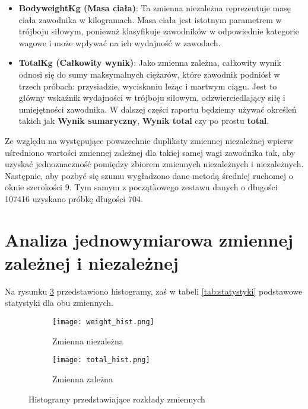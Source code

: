\documentclass{article}
\begin{document}
    \begin{itemize}
        \item \textbf{BodyweightKg (Masa ciała)}: Ta zmienna niezależna reprezentuje masę ciała zawodnika w kilogramach. Masa ciała jest istotnym parametrem w trójboju siłowym, ponieważ klasyfikuje zawodników w odpowiednie kategorie wagowe i może wpływać na ich wydajność w zawodach.
        \item \textbf{TotalKg (Całkowity wynik)}: Jako zmienna zależna, całkowity wynik odnosi się do sumy maksymalnych ciężarów, które zawodnik podniósł w trzech próbach: przysiadzie, wyciskaniu leżąc i martwym ciągu. Jest to główny wskaźnik wydajności w trójboju siłowym, odzwierciedlający siłę i umiejętności zawodnika. W dalszej części raportu będziemy używać określeń takich jak \textbf{Wynik sumaryczny}, \textbf{Wynik total} czy po prostu \textbf{total}.
    \end{itemize}
     
Ze względu na występujące powszechnie duplikaty zmiennej niezależnej wpierw uśredniono wartości zmiennej zależnej dla takiej samej wagi zawodnika tak, aby uzyskać jednoznaczność pomiędzy zbiorem zmiennych niezależnych i niezależnych. Następnie, aby pozbyć się szumu wygładzono dane metodą średniej ruchomej o oknie szerokości 9. Tym samym z początkowego zestawu danych o długości 107416 uzyskano próbkę długości 704. 

\section{Analiza jednowymiarowa zmiennej zależnej i niezależnej} 
Na rysunku \ref{fig:rozkladyzmiennych} przedstawiono histogramy, zaś w tabeli \ref{tab:statystyki} podstawowe statystyki dla obu zmiennych.

\begin{figure}[!htb]
\centering
\begin{subfigure}{.5\textwidth}
  \centering
  \texttt{[image: weight\_hist.png]}
  \caption{Zmienna niezależna}
  \label{fig:rozkladzmiennejniezal}
\end{subfigure}%
\begin{subfigure}{.5\textwidth}
  \centering
  \texttt{[image: total\_hist.png]}
  \caption{Zmienna zależna}
  \label{fig:rozkladzmiennejzal}
\end{subfigure}
\caption{Histogramy przedstawiające rozkłady zmiennych}
\label{fig:rozkladyzmiennych}
\end{figure}
\end{document}
